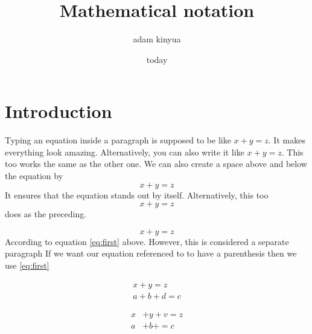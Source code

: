 \documentclass{article}
\title{Mathematical notation}
\author{adam kinyua}
\date{today}
\begin{document}
\maketitle

\section{Introduction}


\iffalse
------------------------------------------------------
-> typing equations inside the paragraph
------------------------------------------------------
\fi


Typing an equation inside a paragraph is supposed to be like \(x+y=z\). It makes everything look amazing. Alternatively, you can also write it like $x+y=z$. This too works the same as the other one. We can also create a space above and below the equation by $$x+y=z$$It ensures that the equation stands out by itself. Alternatively, this too \[x+y=z\]does as the preceding.


\iffalse
------------------------------------------------------
-> the equations and align environments - allowing labelling and numbering of equations so we can refer to them later on. you must use 
-> this is where we make use of \usepackage{amsmath}
------------------------------------------------------
\fi


\begin{equation}
x+y=z \label{eq:first}
\end{equation}
\noindent According to equation \ref{eq:first} above. However, this is considered a separate paragraph
If we want our equation referenced to to have a parenthesis then we use \eqref{eq:first}


\iffalse
------------------------------------------------------
-> if we have more than one equation; check the alignments below:
------------------------------------------------------
\fi


\begin{align}
x+y=z \\
a+b+d=c 
\end{align}

\begin{align}
x&+y+v=z \\
a&+b+=c 
\end{align}

\iffalse
------------------------------------------------------
-> more environments - we only want numbers in equations we want to refer to later
------------------------------------------------------
\fi
\end{document}
